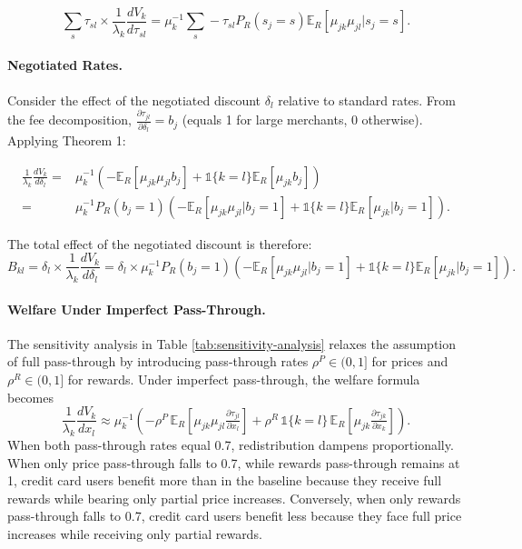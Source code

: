 \documentclass[11pt,english]{article}
\theoremstyle{remark}
\begin{document}
\[
\sum_s \tau_{sl} \times \frac{1}{\lambda_k}\frac{dV_k}{d\tau_{sl}} = \mu_k^{-1}\sum_s -\tau_{sl} P_R(s_j=s) \mathbb{E}_R[\mu_{jk}\mu_{jl}|s_j=s].
\]

\paragraph{Negotiated Rates.}
Consider the effect of the negotiated discount $\delta_l$ relative to standard rates.
From the fee decomposition, $\frac{\partial \tau_{jl}}{\partial \delta_l} = b_j$ (equals 1 for large merchants, 0 otherwise).
Applying Theorem 1:

\begin{align*}
\frac{1}{\lambda_k}\frac{dV_k}{d\delta_l}
= & \mu_k^{-1}\left( -\mathbb{E}_R[\mu_{jk}\mu_{jl} b_j] + \mathbb{1}\{k=l\} \mathbb{E}_R[\mu_{jk} b_j]\right) \\
= & \mu_k^{-1}P_R(b_j=1)\left( -\mathbb{E}_R[\mu_{jk}\mu_{jl}|b_j=1] + \mathbb{1}\{k=l\} \mathbb{E}_R[\mu_{jk}|b_j=1]\right).
\end{align*}

The total effect of the negotiated discount is therefore:
\[
B_{kl} = \delta_l \times \frac{1}{\lambda_k}\frac{dV_k}{d\delta_l} = \delta_l \times \mu_k^{-1}P_R(b_j=1)\left(-\mathbb{E}_R[\mu_{jk}\mu_{jl}|b_j=1] + \mathbb{1}\{k=l\} \mathbb{E}_R[\mu_{jk}|b_j=1]\right).
\]

\paragraph{Welfare Under Imperfect Pass-Through.}
The sensitivity analysis in Table \ref{tab:sensitivity-analysis} relaxes the assumption of full pass-through by introducing pass-through rates $\rho^P \in (0,1]$ for prices and $\rho^R \in (0,1]$ for rewards.
Under imperfect pass-through, the welfare formula becomes
\[
\frac{1}{\lambda_k}\frac{dV_k}{dx_l}
\approx \mu_k^{-1}\left(
-\rho^P\,\mathbb{E}_R\!\left[\mu_{jk}\mu_{jl}\tfrac{\partial\tau_{jl}}{\partial x_l}\right]
+ \rho^R\,\mathbb{1}\{k=l\}\,\mathbb{E}_R\!\left[\mu_{jk}\tfrac{\partial\tau_{jk}}{\partial x_k}\right]
\right).
\]
When both pass-through rates equal 0.7, redistribution dampens proportionally.
When only price pass-through falls to 0.7, while rewards pass-through remains at 1, credit card users benefit more than in the baseline because they receive full rewards while bearing only partial price increases.
Conversely, when only rewards pass-through falls to 0.7, credit card users benefit less because they face full price increases while receiving only partial rewards.
\end{document}

